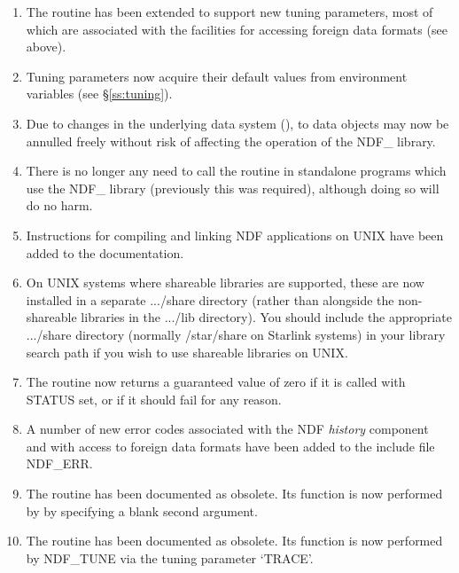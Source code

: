 \documentclass[twoside,11pt,nolof]{starlink}
\providecommand{\st}[1]{{\emph{#1}}}
\begin{document}
\begin{enumerate}
\item The routine  has been extended to support new tuning
parameters, most of which are associated with the facilities for
accessing foreign data formats (see above).

\item Tuning parameters now acquire their default values from
environment variables (see \S\ref{ss:tuning}).

\item Due to changes in the underlying data system
(),  to
data objects may now be annulled freely without risk of affecting the
operation of the NDF\_ library.

\item There is no longer any need to call the routine 
in standalone programs which use the NDF\_ library (previously this
was required), although doing so will do no harm.

\item Instructions for compiling and linking NDF applications on
UNIX have been added to the documentation.

\item On UNIX systems where shareable libraries are supported, these
are now installed in a separate .../share directory (rather than
alongside the non-shareable libraries in the .../lib directory). You
should include the appropriate .../share directory (normally
/star/share on Starlink systems) in your library search path if you
wish to use shareable libraries on UNIX.

\item The routine  now returns a guaranteed value of zero if
it is called with STATUS set, or if it should fail for any reason.

\item A number of new error codes associated with the NDF \st{history\/}
component and with access to foreign data formats have been added to
the include file NDF\_ERR.

\item The routine  has been documented as obsolete. Its
function is now performed by  by specifying a blank second
argument.

\item The routine  has been documented as obsolete. Its
function is now performed by NDF\_TUNE via the tuning parameter
`TRACE'.

\end{enumerate}
\end{document}

